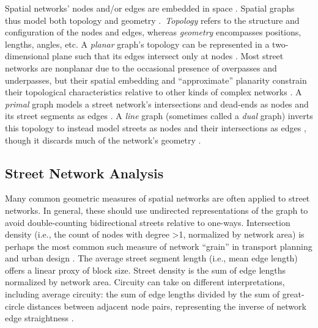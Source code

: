 \documentclass[12pt,letterpaper]{article} %
\begin{document}
Spatial networks' nodes and/or edges are embedded in space \citep{barthelemy_spatial_2022}. Spatial graphs thus model both topology and geometry \citep{fischer_spatial_2014}.\ \textit{Topology} refers to the structure and configuration of the nodes and edges, whereas \textit{geometry} encompasses positions, lengths, angles, etc. A \textit{planar} graph's topology can be represented in a two-dimensional plane such that its edges intersect only at nodes \citep{barthelemy_modeling_2008}. Most street networks are nonplanar due to the occasional presence of overpasses and underpasses, but their spatial embedding and \enquote{approximate} planarity constrain their topological characteristics relative to other kinds of complex networks \citep{boeing_planarity_2020}. A \textit{primal} graph models a street network's intersections and dead-ends as nodes and its street segments as edges \citep{porta_network_2006-1}. A \textit{line} graph (sometimes called a \textit{dual} graph) inverts this topology to instead model streets as nodes and their intersections as edges \citep{porta_network_2006}, though it discards much of the network's geometry \citep{ratti_space_2004}.

\subsection{Street Network Analysis}

Many common geometric measures of spatial networks are often applied to street networks. In general, these should use undirected representations of the graph to avoid double-counting bidirectional streets relative to one-ways. Intersection density (i.e., the count of nodes with degree >1, normalized by network area) is perhaps the most common such measure of network \enquote{grain} in transport planning and urban design \citep[e.g.,][]{ewing_travel_2010}. The average street segment length (i.e., mean edge length) offers a linear proxy of block size. Street density is the sum of edge lengths normalized by network area. Circuity can take on different interpretations, including average circuity: the sum of edge lengths divided by the sum of great-circle distances between adjacent node pairs, representing the inverse of network edge straightness \citep{boeing_urban_2019}.
\end{document}
